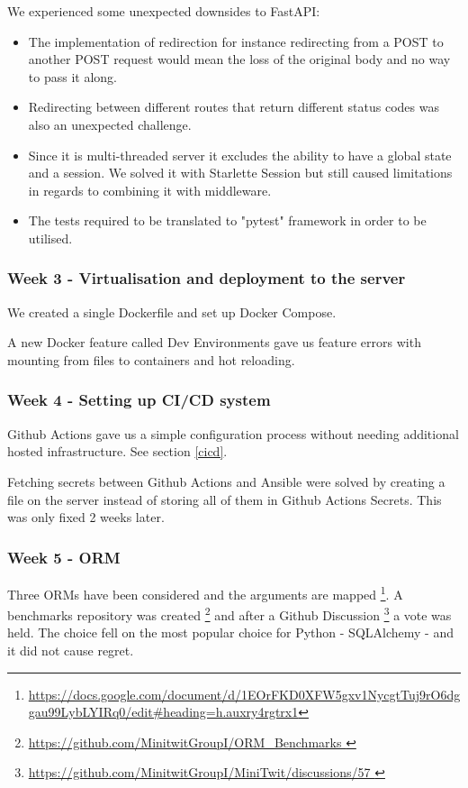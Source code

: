 \documentclass{article}
\begin{document}
We experienced some unexpected downsides to FastAPI:
\begin{itemize}
    \item The implementation of redirection for instance redirecting from a POST to another POST request would mean the loss of the original body and no way to pass it along. 
    \item Redirecting between different routes that return different status codes was also an unexpected challenge. 
    \item Since it is multi-threaded server it excludes the ability to have a global state and a session. We solved it with Starlette Session but still caused limitations in regards to combining it with middleware.
    \item The tests required to be translated to "pytest" framework in order to be utilised.
\end{itemize}

\subsubsection{Week 3 - Virtualisation and deployment to the server}

We created a single Dockerfile and set up Docker Compose. 

A new Docker feature called Dev Environments gave us feature errors with mounting from files to containers and hot reloading.

\subsubsection{Week 4 - Setting up CI/CD system }

Github Actions gave us a simple configuration process without needing additional hosted infrastructure. See section \ref{cicd}. 

Fetching secrets between Github Actions and Ansible were solved by creating a file on the server instead of storing all of them in Github Actions Secrets. This was only fixed 2 weeks later.

\subsubsection{Week 5 - ORM }

Three ORMs have been considered and the arguments are mapped \footnote{\url{https://docs.google.com/document/d/1EOrFKD0XFW5gxv1NycgtTuj9rO6dggau99LybLYIRq0/edit\#heading=h.auxry4rgtrx1}}. A benchmarks repository was created \footnote{\url{https://github.com/MinitwitGroupI/ORM_Benchmarks }} and after a Github Discussion \footnote{\url{https://github.com/MinitwitGroupI/MiniTwit/discussions/57 }} a vote was held. The choice fell on the most popular choice for Python - SQLAlchemy - and it did not cause regret. 
\end{document}
